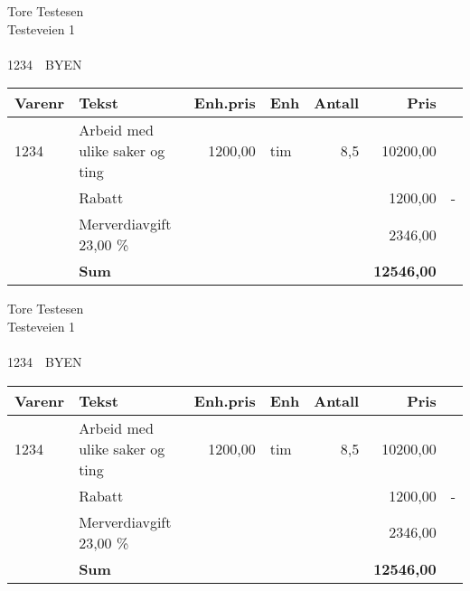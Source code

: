 \documentclass[a4paper]{giro}
\begin{document}
\address{Vollsveien 133\\\ \\1358\ \ JAR}

\begin{giro}{Tore Testesen\\Testeveien 1\\\ \\1234\ \
    BYEN}


\begin{tabular}[t]{lp{8cm}rlrr@{\,}l}
\bf Varenr & \bf Tekst & \bf Enh.pris & \bf Enh & \bf Antall & \bf
Pris & \\\hline
1234 & Arbeid med ulike saker og ting & 1200,00 & tim & 8,5 & 10200,00
& \\
& Rabatt & & & & 1200,00 & - \\
& Merverdiavgift 23,00 \% & & & & 2346,00 & \\\hline
& \bf Sum & & & & \bf 12546,00 \\\hline
\end{tabular}
\end{giro}
\begin{giro}{Tore Testesen\\Testeveien 1\\\ \\1234\ \
    BYEN}


\begin{tabular}[t]{lp{8cm}rlrr@{\,}l}
\bf Varenr & \bf Tekst & \bf Enh.pris & \bf Enh & \bf Antall & \bf
Pris & \\\hline
1234 & Arbeid med ulike saker og ting & 1200,00 & tim & 8,5 & 10200,00
& \\
& Rabatt & & & & 1200,00 & - \\
& Merverdiavgift 23,00 \% & & & & 2346,00 & \\\hline
& \bf Sum & & & & \bf 12546,00 \\\hline
\end{tabular}
\end{giro}
\end{document}
